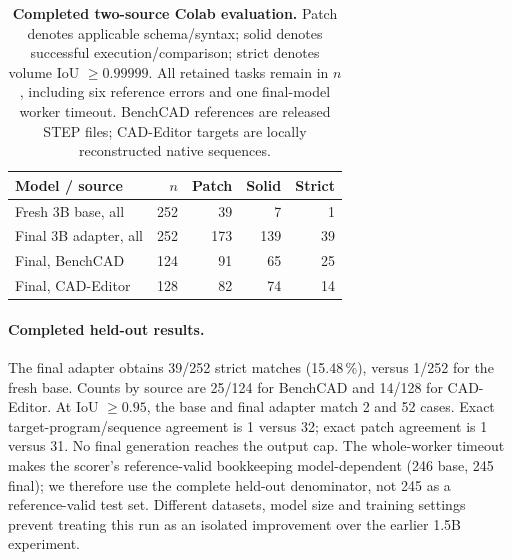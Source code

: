 \begin{table}[t]
\centering\scriptsize
\setlength{\tabcolsep}{3pt}
\begin{tabular}{lrrrr}
\toprule
Model / source & $n$ & Patch & Solid & Strict \\
\midrule
Fresh 3B base, all & 252 & 39 & 7 & 1 \\
Final 3B adapter, all & 252 & 173 & 139 & 39 \\
Final, BenchCAD & 124 & 91 & 65 & 25 \\
Final, CAD-Editor & 128 & 82 & 74 & 14 \\
\bottomrule
\end{tabular}
\caption{\textbf{Completed two-source Colab evaluation.} Patch denotes applicable schema/syntax; solid denotes successful execution/comparison; strict denotes volume IoU $\geq0.99999$. All retained tasks remain in $n$, including six reference errors and one final-model worker timeout. BenchCAD references are released STEP files; CAD-Editor targets are locally reconstructed native sequences.}
\label{tab:colab-completed}
\end{table}
\paragraph{Completed held-out results.}
The final adapter obtains 39/252 strict matches (15.48\,\%), versus 1/252 for the fresh base. Counts by source are 25/124 for BenchCAD and 14/128 for CAD-Editor. At IoU $\geq0.95$, the base and final adapter match 2 and 52 cases. Exact target-program/sequence agreement is 1 versus 32; exact patch agreement is 1 versus 31. No final generation reaches the output cap. The whole-worker timeout makes the scorer's reference-valid bookkeeping model-dependent (246 base, 245 final); we therefore use the complete held-out denominator, not 245 as a reference-valid test set. Different datasets, model size and training settings prevent treating this run as an isolated improvement over the earlier 1.5B experiment.

